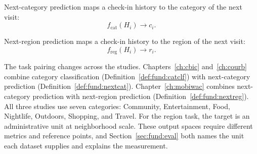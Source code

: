 \begin{definition}\label{def:fund:nextcat}
    Next-category prediction maps a check-in history to the category of the next visit:
    \begin{equation}
        f_{\mathrm{cat}}(H_i)\longrightarrow c_i.
    \end{equation}
\end{definition}

\begin{definition}\label{def:fund:nextreg}
    Next-region prediction maps a check-in history to the region of the next visit:
    \begin{equation}
        f_{\mathrm{reg}}(H_i)\longrightarrow r_i.
    \end{equation}
\end{definition}

The task pairing changes across the studies. Chapters~\ref{ch:cbic}
and~\ref{ch:courb} combine category classification
(Definition~\ref{def:fund:catclf}) with next-category prediction
(Definition~\ref{def:fund:nextcat}). Chapter~\ref{ch:mobiwac} combines next-category
prediction with next-region prediction (Definition~\ref{def:fund:nextreg}). All three
studies use seven categories: Community, Entertainment, Food, Nightlife, Outdoors,
Shopping, and Travel. For the region task, the target is an administrative unit at
neighborhood scale. These output spaces require different metrics and reference points,
and Section~\ref{sec:fund:eval} both names the unit each dataset supplies and explains
the measurement.

